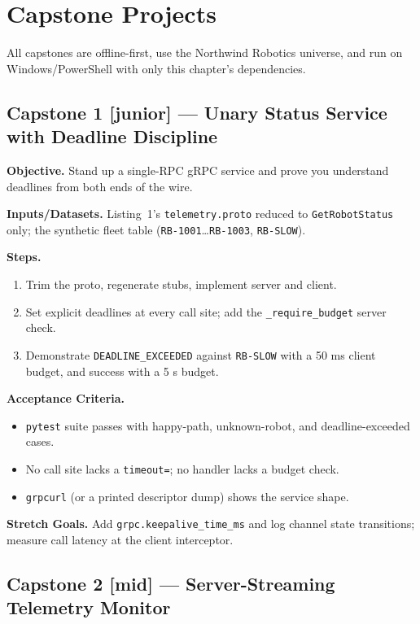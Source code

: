 \section{Capstone Projects}
\label{sec:ch13-capstones}

All capstones are offline-first, use the Northwind Robotics universe, and run
on Windows/PowerShell with only this chapter's dependencies.

\subsection{Capstone 1 [junior] --- Unary Status Service with Deadline Discipline}

\textbf{Objective.} Stand up a single-RPC gRPC service and prove you understand
deadlines from both ends of the wire.

\textbf{Inputs/Datasets.} Listing~1's \texttt{telemetry.proto} reduced to
\texttt{GetRobotStatus} only; the synthetic fleet table
(\texttt{RB-1001}\ldots\texttt{RB-1003}, \texttt{RB-SLOW}).

\textbf{Steps.}
\begin{enumerate}
  \item Trim the proto, regenerate stubs, implement server and client.
  \item Set explicit deadlines at every call site; add the
        \texttt{\_require\_budget} server check.
  \item Demonstrate \texttt{DEADLINE\_EXCEEDED} against \texttt{RB-SLOW} with a
        50 ms client budget, and success with a 5 s budget.
\end{enumerate}

\textbf{Acceptance Criteria.}
\begin{itemize}
  \item[$\square$] \texttt{pytest} suite passes with happy-path, unknown-robot,
        and deadline-exceeded cases.
  \item[$\square$] No call site lacks a \texttt{timeout=}; no handler lacks a
        budget check.
  \item[$\square$] \texttt{grpcurl} (or a printed descriptor dump) shows the
        service shape.
\end{itemize}

\textbf{Stretch Goals.} Add \texttt{grpc.keepalive\_time\_ms} and log channel
state transitions; measure call latency at the client interceptor.

\subsection{Capstone 2 [mid] --- Server-Streaming Telemetry Monitor}

